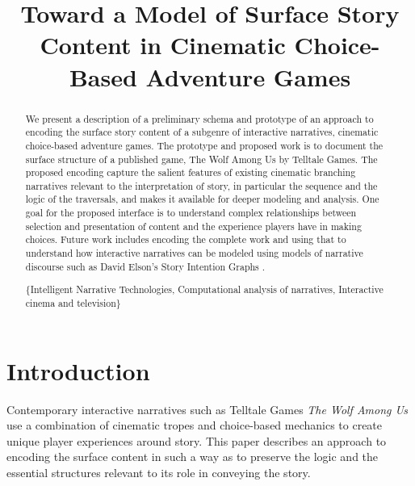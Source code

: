 \documentclass{llncs}
\title{Toward a Model of Surface Story Content in Cinematic Choice-Based Adventure Games}
\begin{document}
\maketitle
\begin{abstract}
\label{sec:orgheadline1}
We present a description of a preliminary schema and prototype of an approach to encoding the surface story content of a subgenre of interactive narratives, cinematic choice-based adventure games. The prototype and proposed work is to document the surface structure of a published game, The Wolf Among Us by Telltale Games. The proposed encoding capture the salient features of existing cinematic branching narratives relevant to the interpretation of story, in particular the sequence and the logic of the traversals, and makes it available for deeper modeling and analysis. One goal for the proposed interface is to understand complex relationships between selection and presentation of content and the experience players have in making choices. Future work includes encoding the complete work and using that to understand how interactive narratives can be modeled using models of narrative discourse such as David Elson's Story Intention Graphs \cite{Elson2012}.

\keywords\{Intelligent Narrative Technologies, Computational analysis
of narratives, Interactive cinema and television\}
\end{abstract}
\section*{Introduction}
\label{sec:orgheadline2}
Contemporary interactive narratives such as Telltale Games \emph{The Wolf
Among Us} use a combination of cinematic tropes and choice-based
mechanics to create unique player experiences around story. This paper
describes an approach to encoding the surface content in such a way as
to preserve the logic and the essential structures relevant to its
role in conveying the story.
\end{document}
